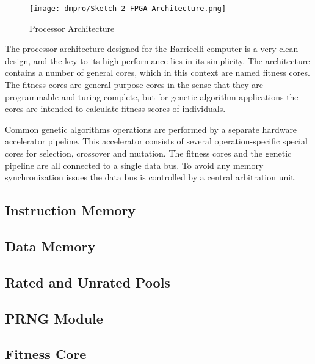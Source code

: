 \begin{figure}[H]
\texttt{[image: dmpro/Sketch-2---FPGA-Architecture.png]}
\caption{Processor Architecture}
\label{figure:fpga-architecture}
\end{figure}

The processor architecture designed for the Barricelli computer is a very clean design, and the key to its high performance lies in its simplicity.
The architecture contains a number of general cores, which in this context are named fitness cores.
The fitness cores are general purpose cores in the sense that they are programmable and turing complete, but for genetic algorithm applications the cores are intended to calculate fitness scores of individuals.

Common genetic algorithms operations are performed by a separate hardware accelerator pipeline.
This accelerator consists of several operation-specific special cores for selection, crossover and mutation.
The fitness cores and the genetic pipeline are all connected to a single data bus.
To avoid any memory synchronization issues the data bus is controlled by a central arbitration unit.


\subsection{Instruction Memory}
\label{subsec:fpga-instruction-memory}


\subsection{Data Memory}
\label{subsec:fpga-data-memory}


\subsection{Rated and Unrated Pools}


\subsection{PRNG Module}
    
 

\subsection{Fitness Core} \label{fpga:fitness:ss:design_of_the_fitness_core}
     \label{fpga:subsection:fitness_core}


